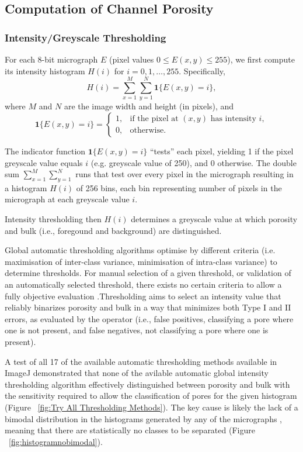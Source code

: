 \documentclass[3p,twocolumn]{elsarticle}
\begin{document}
	\subsection{Computation of Channel Porosity}
\subsubsection{Intensity/Greyscale Thresholding}

For each 8-bit micrograph \(E\) (pixel values \(0 \le E(x,y) \le 255\)), we
first compute its intensity histogram \(H(i)\) for \(i=0,1,\dots,255\).
Specifically,
\[
H(i) = \sum_{x=1}^{M}\sum_{y=1}^{N} \mathbf{1}\{E(x,y)=i\},
\]
where \(M\) and \(N\) are the image width and height (in pixels), and
\[
\mathbf{1}\{E(x,y)=i\} =
\begin{cases}
1, & \text{if the pixel at }(x,y)\text{ has intensity }i,\\
0, & \text{otherwise.}
\end{cases}
\]

The indicator function \(\mathbf{1}\{E(x,y)=i\}\) “tests” each pixel, yielding 1
if the pixel greyscale value equals \(i\) (e.g. greyscale value of 250), and 0
otherwise. The double sum \(\sum_{x=1}^M\sum_{y=1}^N\) runs that test over every
pixel in the micrograph resulting in a histogram \(H(i)\) of 256 bins, each bin
representing number of pixels in the micrograph at each greyscale value \(i\). 

Intensity thresholding then \(H(i)\) determines a greyscale value
at which porosity and bulk (i.e., foregound and background) are distinguished.

Global automatic thresholding algorithms optimise by different
criteria (i.e. maximisation of inter-class variance, minimisation of
intra-class variance) to determine thresholds. For manual selection of a given
threshold, or validation of an automatically selected threshold, there exists
no certain criteria to allow a fully objective evaluation
\citep{Huang2019}.Thresholding aims to select an intensity value that reliably
binarizes porosity and bulk in a way that minimizes both Type I and II errors,
as evaluated by the operator (i.e., false positives, classifying a pore where
one is not present, and false negatives, not classifying a pore where one is
present).

A test of all 17 of the available automatic thresholding methods available in
ImageJ demonstrated that none of the avilable automatic global intensity
thresholding algorithm effectively distinguished between porosity and bulk
with the sensitivity required to allow the classification of pores for the
given histogram (Figure ~\ref{fig:Try All Thresholding Methods}). The key
cause is likely the lack of a bimodal distribution in the histograms generated
by any of the micrographs , meaning that there are statistically no classes to
be separated (Figure ~\ref{fig:histogramnobimodal}). 
\end{document}
